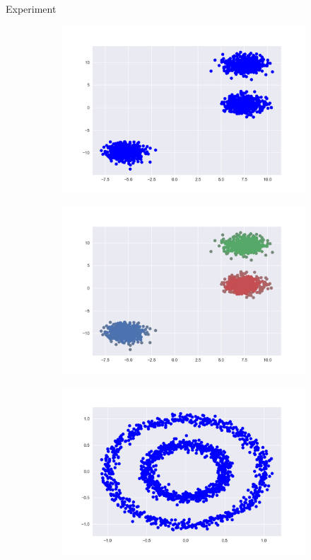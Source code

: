 \documentclass{beamer}
\begin{document}
\begin{frame}{Experiment}
\begin{figure}[h!]
	\begin{subfigure}{.5\textwidth}
		\centering
		\includegraphics[width=.8\linewidth]{b_figure_1.png}
	\end{subfigure}%
	\begin{subfigure}{.5\textwidth}
		\centering
		\includegraphics[width=.8\linewidth]{b_figure_2.png}
	\end{subfigure}
\end{figure}
\begin{figure}[h!]
	\begin{subfigure}{.5\textwidth}
		\centering
		\includegraphics[width=.8\linewidth]{c_figure_1.png}

\end{subfigure}
\end{figure}
\end{frame}
\end{document}
